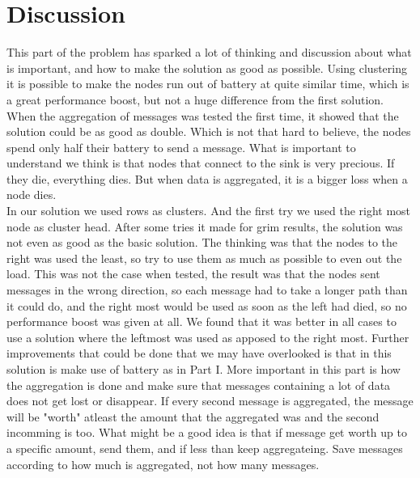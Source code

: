 \documentclass{article}
\begin{document}
  \section{Discussion}
  This part of the problem has sparked a lot of thinking and discussion about what
  is important, and how to make the solution as good as possible. Using clustering 
  it is possible to make the nodes run out of battery at quite similar time, which
  is a great performance boost, but not a huge difference from the first solution.
  When the aggregation of messages was tested the first time, it showed that the
  solution could be as good as double. Which is not that hard to believe, the nodes
  spend only half their battery to send a message. What is important to understand
  we think is that nodes that connect to the sink is very precious. If they die, 
  everything dies. But when data is aggregated, it is a bigger loss when a node
  dies.\\
  In our solution we used rows as clusters. And the first try we used the right most
  node as cluster head. After some tries it made for grim results, the solution 
  was not even as good as the basic solution. The thinking was that the nodes
  to the right was used the least, so try to use them as much as possible to
  even out the load. This was not the case when tested, the result was that
  the nodes sent messages in the wrong direction, so each message had to take a 
  longer path than it could do, and the right most would be used as soon as the
  left had died, so no performance boost was given at all. We found that it
  was better in all cases to use a solution where the leftmost
  was used as apposed to the right most. Further improvements that could be done
  that we may have overlooked is that in this solution is make use of battery
  as in Part I. More important in this part is how the aggregation is done
  and make sure that messages containing a lot of data does not get lost or
  disappear. If every second message is aggregated, the message will be
  "worth" atleast the amount that the aggregated was and the second incomming
  is too. What might be a good idea is that if message get worth up to a
  specific amount, send them, and if less than keep aggregateing. Save messages
  according to how much is aggregated, not how many messages.

  
\end{document}
